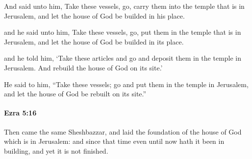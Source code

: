 			And said unto him, Take these vessels, go, carry them into the temple that is in Jerusalem, and let the house of God be builded in his place.

			\begin{versebox}
					\item[BHS] 
					\item[LXX] 
					\item[ASV] and he said unto him, Take these vessels, go, put them in the temple that is in Jerusalem, and let the house of God be builded in its place.
					\item[NIV] and he told him, ‘Take these articles and go and deposit them in the temple in Jerusalem. And rebuild the house of God on its site.’
					\item[NRSV] He said to him, “Take these vessels; go and put them in the temple in Jerusalem, and let the house of God be rebuilt on its site.”
			\end{versebox}

		\paragraph{Ezra 5:16} %
			\label{EZRA-5-16}

			Then came the same Sheshbazzar, and laid the foundation of the house of God which is in Jerusalem: and since that time even until now hath it been in building, and yet it is not finished.

